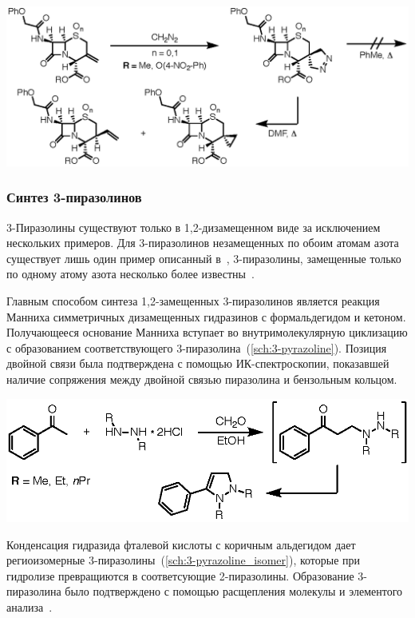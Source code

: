 \begin{scheme}
    \centering
    \includegraphics{sections/literature/img/cefalosporine.eps}
    \caption{}
    \label{sch:cefalosporine}
\end{scheme}


\subsubsection{Синтез 3-пиразолинов}
3-Пиразолины существуют только в 1,2-дизамещенном виде за исключением нескольких примеров.
Для 3-пиразолинов незамещенных по обоим атомам азота существует лишь один пример описанный в~\cite{Misani1956}, 3-пиразолины, замещенные только по одному атому азота несколько более известны~\cite{Takamizawa1963, Takamizawa1965, Armstrong1973, Burger1979}.

Главным способом синтеза 1,2-замещенных 3-пиразолинов является реакция Манниха симметричных дизамещенных гидразинов с формальдегидом и кетоном. Получающееся основание Манниха вступает во внутримолекулярную циклизацию с образованием соответствующего 3-пиразолина~(\ref{sch:3-pyrazoline}).
Позиция двойной связи была подтверждена с помощью ИК-спектроскопии, показавшей наличие сопряжения между двойной связью пиразолина и бензольным кольцом.

\begin{scheme}
    \centering
    \includegraphics{sections/literature/img/3-pyrazoline.eps}
    \caption{}
    \label{sch:3-pyrazoline}
\end{scheme}

Конденсация гидразида фталевой кислоты с коричным альдегидом дает региоизомерные 3-пиразолины~(\ref{sch:3-pyrazoline_isomer}), которые при гидролизе превращиются в соответсующие 2-пиразолины.
Образование 3-пиразолина было подтверждено с помощью расщепления молекулы и элементого анализа~\cite{Chemistry1967}.

